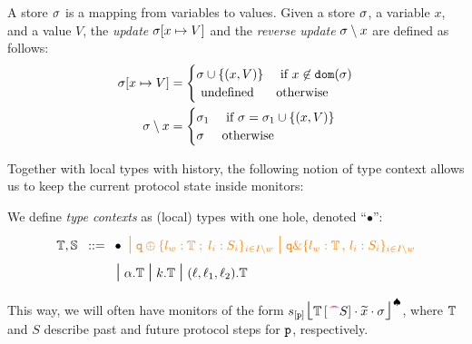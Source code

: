 \documentclass[runningheads]{llncs}
\newcommand{\erase}[1]{\textcolor{orange}{#1}}
\begin{document}
\begin{definition} \label{d:store}
A store $\sigma$ is a mapping from variables to values. Given a store $\sigma$, a variable $x$, and a value $V$, 
the \emph{update} $\sigma[x\mapsto V]$ and the 
 \emph{reverse update} $\sigma\setminus x$ are defined as follows:
\begin{align*}
\sigma[x\mapsto V] & = \begin{cases}
\sigma\cup \{(x,V)\} &\text{ if } x\not\in \mathtt{dom}(\sigma) \\ 
\text{ undefined }  & \text{otherwise}
\end{cases} 
\\
\sigma\setminus x & =  \begin{cases}
\sigma_1 &\text{ if } \sigma=\sigma_1\cup \{(x,V)\} \\ 
\sigma  & \text{otherwise}
\end{cases} 
\end{align*}
\end{definition}

\noindent Together with local types with history, the following notion of type context allows us to keep the current protocol state inside monitors: 
\begin{definition} 
 We define 
\textit{type contexts} as (local) types with one hole, denoted ``$\bullet$'':
\begin{align*}
 \ctx{T},\ctx{S}   \bnfis  &  \bullet  \erase{\sbnfbar
 \q\btsel{\lbl_w:\ctx{T} \;;\; \lbl_i:S_i}_{i \in I\setminus w} \sbnfbar \q\btbra{\lbl_w:\ctx{T} \, , \, \lbl_i:S_i}_{i \in I\setminus w}}
 \\
  &\sbnfbar   \alpha.\ctx{T} \sbnfbar    k.\ctx{T} \sbnfbar (\loc,\loc_1,\loc_2).\ctx{T} 
\end{align*}
\end{definition}
This way, we will often have monitors of the form
${s_{[\mathtt{p}]}\mbox{{\Large $\lfloor$}} \textcolor{black}{{\mathbb{T}\left[\textcolor{black}{\,\textcolor{magenta}{\text{\textbf{\textasciicircum\!\!\textasciicircum}}} S}\right]}}\cdot \widetilde{x}\cdot \sigma \mbox{{\Large $\rfloor$}}^{\spadesuit}}$, where  
$\mathbb{T}$ and $S$ describe past and future protocol steps for $\mathtt{p}$, respectively.
\end{document}
